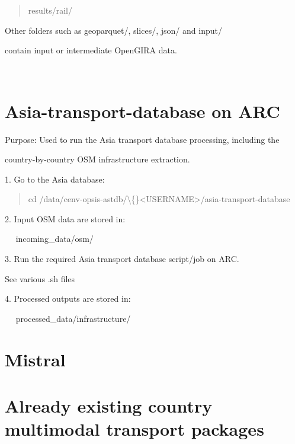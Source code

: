 \documentclass[11pt,a4paper]{article}
\begin{document}
\begin{quote}\ttfamily results/rail/\end{quote}

Other folders such as geoparquet/, slices/, json/ and input/\par

contain input or intermediate OpenGIRA data.\par

 \par

\section{Asia-transport-database on ARC}

Purpose: Used to run the Asia transport database processing, including the\par

country-by-country OSM infrastructure extraction.\par

1. Go to the Asia database:\par

\begin{quote}\ttfamily cd /data/cenv-opsis-astdb/\textbackslash\{\}<USERNAME>/asia-transport-database\end{quote}

2. Input OSM data are stored in:\par

   incoming\_data/osm/\par

3. Run the required Asia transport database script/job on ARC.\par

See various .sh files\par

4. Processed outputs are stored in:\par

   processed\_data/infrastructure/\par

\section{Mistral}

\section{Already existing country multimodal transport packages}
\end{document}
